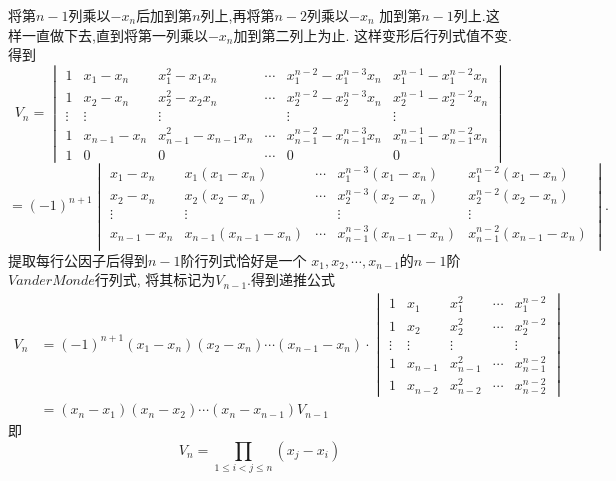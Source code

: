 \begin{solution}
  将第$n-1$列乘以$-x_n$后加到第$n$列上,再将第$n-2$列乘以$-x_n$
  加到第$n-1$列上.这样一直做下去,直到将第一列乘以$-x_n$加到第二列上为止.
  这样变形后行列式值不变.得到
  \begin{equation*}
    V_n  =
    \begin{vmatrix}
    1 & x_1-x_n & x_1^2-x_1x_n & \cdots & x_1^{n-2}-x_1^{n-3}x_n & x_1^{n-1}-x_1^{n-2}x_n\\[3pt]
    1 & x_2-x_n & x_2^2-x_2x_n & \cdots & x_2^{n-2}-x_2^{n-3}x_n & x_2^{n-1}-x_2^{n-2}x_n\\[3pt]
    \vdots & \vdots & \vdots & & \vdots & \vdots\\[3pt]
    1 & x_{n-1}-x_n & x_{n-1}^2-x_{n-1}x_n & \cdots & x_{n-1}^{n-2}-x_{n-1}^{n-3}x_n & x_{n-1}^{n-1}-x_{n-1}^{n-2}x_n\\[3pt]
    1 & 0 & 0 & \cdots & 0 & 0
    \end{vmatrix}
  \end{equation*}
  \begin{equation*}
   = (-1)^{n+1}
    \begin{vmatrix}
    x_1-x_n & x_1(x_1-x_n) & \cdots & x_1^{n-3}(x_1-x_n) & x_1^{n-2}(x_1-x_n)\\[3pt]
    x_2-x_n & x_2(x_2-x_n) & \cdots & x_2^{n-3}(x_2-x_n) & x_2^{n-2}(x_2-x_n)\\[3pt]
    \vdots & \vdots &  & \vdots & \vdots\\[3pt]
    x_{n-1}-x_n & x_{n-1}(x_{n-1}-x_n) & \cdots & x_{n-1}^{n-3}(x_{n-1}-x_n) & x_{n-1}^{n-2}(x_{n-1}-x_n)\\[3pt]
    \end{vmatrix}.
  \end{equation*}
  提取每行公因子后得到$n-1$阶行列式恰好是一个
  $x_1,x_2,\cdots,x_{n-1}$的$n-1$阶$Vander Monde$行列式,
  将其标记为$V_{n-1}$.得到递推公式
  \begin{equation*}
    \begin{split}
    V_n &  =
    (-1)^{n+1}(x_1-x_n)(x_2-x_n)\cdots(x_{n-1}-x_n)\cdot
    \begin{vmatrix}
      1 & x_1 & x_1^2 & \cdots & x_1^{n-2}\\[3pt]
      1 & x_2 & x_2^2 & \cdots & x_2^{n-2}\\[3pt]
      \vdots & \vdots & \vdots & & \vdots\\[3pt]
      1 & x_{n-1} & x_{n-1}^2 & \cdots & x_{n-1}^{n-2}\\[3pt]
      1 & x_{n-2} & x_{n-2}^2 & \cdots & x_{n-2}^{n-2}
    \end{vmatrix}\\
    & = (x_n-x_1)(x_n-x_2)\cdots(x_n-x_{n-1})V_{n-1}
   \end{split}
  \end{equation*}
   即
   \begin{equation*}
     V_n= \prod_{1 \leq i <j \leq n}(x_j-x_i)
   \end{equation*}
\end{solution}

